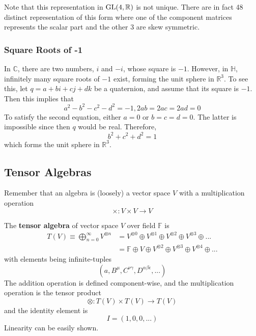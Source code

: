   Note that this representation in $\operatorname{GL}(4, \mathbb{R})$ is not unique. There are in fact 48 distinct representation of this form where one of the component matrices represents the scalar part and the other 3 are skew symmetric. 

\subsubsection{Square Roots of -1}

  In $\mathbb{C}$, there are two numbers, $i$ and $-i$, whose square is $-1$. However, in $\mathbb{H}$, infinitely many square roots of $-1$ exist, forming the unit sphere in $\mathbb{R}^3$. To see this, let $q = a+bi+cj+dk$ be a quaternion, and assume that its square is $-1$. Then this implies that
  \begin{equation}
    a^2 - b^2 -c^2 -d^2 = -1, 2ab = 2ac = 2ad = 0
  \end{equation}
  To satisfy the second equation, either $a=0$ or $b=c=d=0$. The latter is impossible since then $q$ would be real. Therefore, 
  \begin{equation}
    b^2 + c^2 + d^2 = 1
  \end{equation}
  which forms the unit sphere in $\mathbb{R}^3$. 

\subsection{Tensor Algebras}

  Remember that an algebra is (loosely) a vector space $V$ with a multiplication operation
  \begin{equation}
    \times: V \times V \longrightarrow V
  \end{equation}

  \begin{definition}
    The \textbf{tensor algebra} of vector space $V$ over field $\mathbb{F}$ is 
    \begin{align*}
      T(V) \equiv \bigoplus_{n = 0}^{\infty} V^{\otimes n} & = V^{\otimes 0} \oplus V^{\otimes 1} \oplus V^{\otimes 2} \oplus V^{\otimes 3} \oplus ... \\
      & = \mathbb{F} \oplus V \oplus V^{\otimes 2} \oplus V^{\otimes 3} \oplus V^{\otimes 4} \oplus ...
    \end{align*}
    with elements being infinite-tuples
    \begin{equation}
      (a, B^\mu, C^{\nu \gamma}, D^{\alpha \beta \epsilon}, ...)
    \end{equation}
    The addition operation is defined component-wise, and the multiplication operation is the tensor product 
    \begin{equation}
      \otimes: T(V) \times T(V) \longrightarrow T(V)
    \end{equation}
    and the identity element is
    \begin{equation}
      I = (1, 0, 0, ...)
    \end{equation}
    Linearity can be easily shown. 
  \end{definition}

